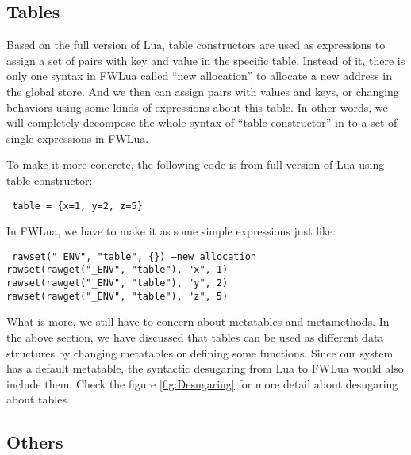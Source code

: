 \documentclass{article}
\begin{document}
\subsection{Tables}

Based on the full version of Lua, table constructors are used as expressions to assign a set of pairs with key and value in the specific table. Instead of it, there is only one syntax in FWLua called ``new allocation'' to allocate a new address in the global store. And we then can assign pairs with values and keys, or changing behaviors using some kinds of expressions about this table. In other words, we will completely decompose the whole syntax of ``table constructor'' in to a set of single expressions in FWLua. 

To make it more concrete, the following code is from full version of Lua using table constructor:
\begin{flushleft}
{\tt
table = \{x=1, y=2, z=5\}\\
}
\end{flushleft}
In FWLua, we have to make it as some simple expressions just like:
\begin{flushleft}
{\tt
rawset("\_ENV", "table", \{\}) --new allocation\\
rawset(rawget("\_ENV", "table"), "x", 1)\\
rawset(rawget("\_ENV", "table"), "y", 2)\\
rawset(rawget("\_ENV", "table"), "z", 5)\\
}
\end{flushleft}

What is more, we still have to concern about metatables and metamethods. In the above section, we have discussed that tables can be used as different data structures by changing metatables or defining some functions. Since our system has a default metatable, the syntactic desugaring from Lua to FWLua would also include them. Check the figure \ref{fig:Desugaring} for more detail about desugaring about tables.

\subsection{Others}
\end{document}
